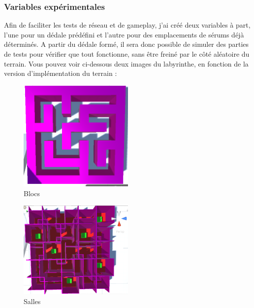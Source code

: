 \documentclass{article}
\begin{document}
\subsubsection{Variables expérimentales}
Afin de faciliter les tests de réseau et de gameplay, j'ai créé deux variables à part, l'une pour un dédale prédéfini et l'autre pour des emplacements de sérums déjà déterminés. A partir du dédale formé, il sera donc possible de simuler des parties de tests pour vérifier que tout fonctionne, sans être freiné par le côté aléatoire du terrain. Vous pouvez voir ci-dessous deux images du labyrinthe, en fonction de la version d'implémentation du terrain :


\par\vspace{0.5cm}
\begin{figure}[!ht]
    \centering
    \includegraphics[width=0.5\textwidth]{Blocs.PNG}
    \caption{Blocs}
    \label{Blocs}
\end{figure}{}

\par\vspace{0.5cm}
\begin{figure}[!ht]
    \centering
    \includegraphics[width=0.5\textwidth]{Salles.PNG}
    \caption{Salles}
    \label{Salles}
\end{figure}{}
\end{document}

